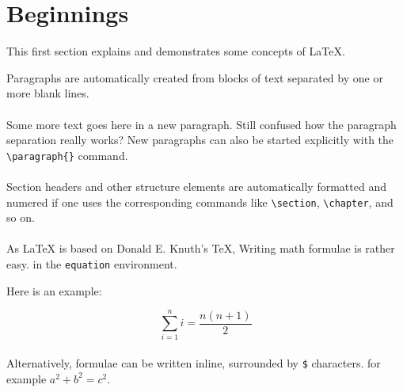\documentclass{article}
\begin{document}
\section{Beginnings}
\label{sec:beginnings}

This first section explains and demonstrates some concepts of {\LaTeX}.

Paragraphs are automatically created from blocks of text separated by one or more
blank lines.


\paragraph{} Some more text goes here in a new paragraph.
Still confused how the paragraph separation really works?
New paragraphs can also be started explicitly with the \verb|\paragraph{}| command.



\paragraph{} Section headers and other structure elements are automatically formatted and numered
if one uses the corresponding commands like \verb|\section|, \verb|\chapter|, and
so on.


\paragraph{} As {\LaTeX} is based on Donald E. Knuth's {\TeX},
Writing math formulae is rather easy. in the \verb+equation+ environment.

Here is an example:


\begin{equation}
\label{eq:example}
\sum_{i=1}^{n}i = \frac{n(n+1)}{2}
\end{equation}

\paragraph{} Alternatively, formulae can be written inline, surrounded
by \verb|$| characters. for example $a^2 + b^2 = c^2$.
\end{document}
